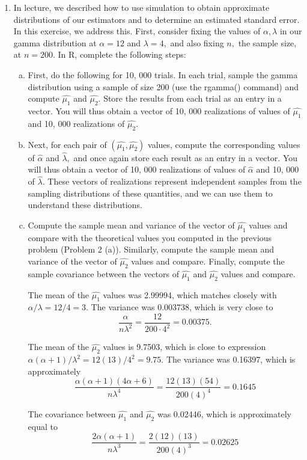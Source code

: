 \documentclass{article}
\begin{document}
\begin{enumerate}
	\item In lecture, we described how to use simulation to obtain approximate distributions of our estimators and to determine an estimated standard error. In this exercise, we address this. First, consider fixing the values of $\alpha, \lambda$ in our gamma distribution at $\alpha=12$ and $\lambda=4,$ and also fixing $n,$ the sample size, at $n=200.$ In R, complete the following steps:
		\begin{enumerate}[a)]
			\item First, do the following for 10, 000 trials. In each trial, sample the gamma distribution using a sample of size 200 (use the rgamma() command) and compute $\hat{\mu_1}$ and $\hat{\mu_2}.$ Store the results from each trial as an entry in a vector. You will thus obtain a vector of 10, 000 realizations of values of $\hat{\mu_1}$ and 10, 000 realizations of $\hat{\mu_2}.$

			\item Next, for each pair of $(\hat{\mu_1}, \hat{\mu_2})$ values, compute the corresponding values of $\hat{\alpha}$ and $\hat{\lambda},$ and once again store each result as an entry in a vector. You will thus obtain a vector of 10, 000 realizations of values of $\hat{\alpha}$ and 10, 000 of $\hat{\lambda}.$ These vectors of realizations represent independent samples from the sampling distributions of these quantities, and we can use them to understand these distributions.

			\item Compute the sample mean and variance of the vector of $\hat{\mu_1}$ values and compare with the theoretical values you computed in the previous problem (Problem 2 (a)). Similarly, compute the sample mean and variance of the vector of $\hat{\mu_2}$ values and compare. Finally, compute the sample covariance between the vectors of $\hat{\mu_1}$ and $\hat{\mu_2}$ values and compare.
				\begin{soln}
					The mean of the $\hat{\mu_1}$ values was 2.99994, which matches closely with $\alpha/\lambda=12/4=3.$ The variance was 0.003738, which is very close to \[\frac{\alpha}{n\lambda^2}=\frac{12}{200\cdot4^2}=0.00375.\]

				The mean of the $\hat{\mu_2}$ values is 9.7503, which is close to expression $\alpha(\alpha+1)/\lambda^2=12(13)/4^2=9.75.$ The variance was 0.16397, which is approximately \[\frac{\alpha(\alpha+1)(4\alpha+6)}{n\lambda^4} = \frac{12(13)(54)}{200(4)^4}=0.1645\]

				The covariance between $\hat{\mu_1}$ and $\hat{\mu_2}$ was 0.02446, which is approximately equal to \[\frac{2\alpha(\alpha+1)}{n\lambda^3}=\frac{2(12)(13)}{200(4)^3}=0.02625\]


\end{soln}
\end{enumerate}
\end{enumerate}
\end{document}
